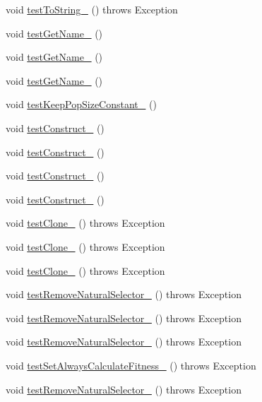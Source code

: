 \begin{DoxyCompactItemize}
\item 
void \hyperlink{classorg_1_1jgap_1_1_configuration_test_a721aec37876aaaf9d30ce0a9691b16f4}{test\-To\-String\-\_} ()  throws Exception 
\item 
void \hyperlink{classorg_1_1jgap_1_1_configuration_test_af92ee52ef143c253fe8952a677526931}{test\-Get\-Name\-\_} ()
\item 
void \hyperlink{classorg_1_1jgap_1_1_configuration_test_a31f0f54000dc87a89a2116eb9800cf45}{test\-Get\-Name\-\_} ()
\item 
void \hyperlink{classorg_1_1jgap_1_1_configuration_test_a5235282eabed0c5f9887663837e39fa1}{test\-Get\-Name\-\_} ()
\item 
void \hyperlink{classorg_1_1jgap_1_1_configuration_test_a0c1a2a3771c95af6d8ef3d1d265dc739}{test\-Keep\-Pop\-Size\-Constant\-\_} ()
\item 
void \hyperlink{classorg_1_1jgap_1_1_configuration_test_a348761f8920b09337075559a05c7fd71}{test\-Construct\-\_} ()
\item 
void \hyperlink{classorg_1_1jgap_1_1_configuration_test_a1d464f97edea8247638d773234ef4ff2}{test\-Construct\-\_} ()
\item 
void \hyperlink{classorg_1_1jgap_1_1_configuration_test_a40bad0cde28683c84731ca1d8c20c9db}{test\-Construct\-\_} ()
\item 
void \hyperlink{classorg_1_1jgap_1_1_configuration_test_afdf8809f5a2c8099aa55d93685a7effa}{test\-Construct\-\_} ()
\item 
void \hyperlink{classorg_1_1jgap_1_1_configuration_test_ab1ccb8e286024909d40b193c97617fb1}{test\-Clone\-\_} ()  throws Exception 
\item 
void \hyperlink{classorg_1_1jgap_1_1_configuration_test_afd83d2a04dc2799ca3a84326788f83c2}{test\-Clone\-\_} ()  throws Exception 
\item 
void \hyperlink{classorg_1_1jgap_1_1_configuration_test_a6280daabbb8d11954bc98eae885d6d2f}{test\-Clone\-\_} ()  throws Exception 
\item 
void \hyperlink{classorg_1_1jgap_1_1_configuration_test_a166df4df83593fb6e2cb7b255144e347}{test\-Remove\-Natural\-Selector\-\_} ()  throws Exception 
\item 
void \hyperlink{classorg_1_1jgap_1_1_configuration_test_a4108aa854195d2518925f1536d9e5601}{test\-Remove\-Natural\-Selector\-\_} ()  throws Exception 
\item 
void \hyperlink{classorg_1_1jgap_1_1_configuration_test_a3655c137b8bdeea66d82656734ff1984}{test\-Remove\-Natural\-Selector\-\_} ()  throws Exception 
\item 
void \hyperlink{classorg_1_1jgap_1_1_configuration_test_a8bba666538715a876862a95d44f2d304}{test\-Set\-Always\-Calculate\-Fitness\-\_} ()  throws Exception 
\item 
void \hyperlink{classorg_1_1jgap_1_1_configuration_test_a76a3e14666890e57f04e7d475695ee40}{test\-Remove\-Natural\-Selector\-\_} ()  throws Exception 
\end{DoxyCompactItemize}

